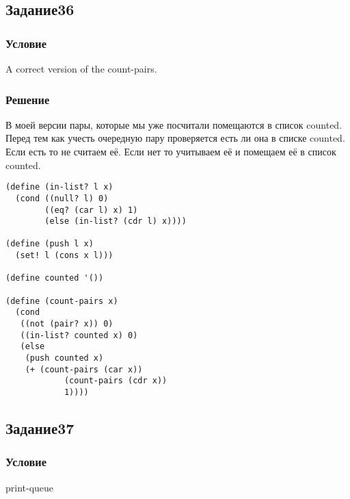 \documentclass[10pt,a4paper]{article}
\begin{document}
\subsection*{Задание36}
\subsubsection*{Условие}
A correct version of the count-pairs.
\subsubsection*{Решение}
В моей версии пары, которые мы уже посчитали помещаются в список
counted. Перед тем как учесть очередную пару проверяется есть ли она
в списке counted. Если есть то не считаем её. Если нет то учитываем её
и помещаем её в список counted.
\begin{lstlisting}
(define (in-list? l x)
  (cond ((null? l) 0)
        ((eq? (car l) x) 1)
        (else (in-list? (cdr l) x))))

(define (push l x)
  (set! l (cons x l)))

(define counted '())

(define (count-pairs x)
  (cond
   ((not (pair? x)) 0)
   ((in-list? counted x) 0)
   (else
    (push counted x)
    (+ (count-pairs (car x))
            (count-pairs (cdr x))
            1))))
\end{lstlisting}

\subsection*{Задание37}
\subsubsection*{Условие}
print-queue
\end{document}
